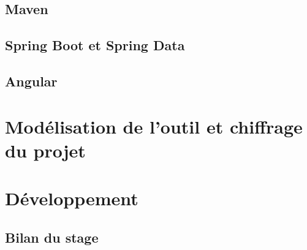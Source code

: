\documentclass{polytech/polytech}
\begin{document}
\chapter{Maven}


\chapter{Spring Boot et Spring Data}


\chapter{Angular}


\part{Modélisation de l'outil et chiffrage du projet}


\part{Développement}


\chapter{Bilan du stage}


\appendix
\end{document}
